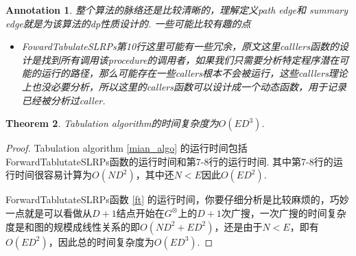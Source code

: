 \documentclass{article}
\newtheorem{theorem}{Theorem}[section]
\newtheorem{annotation}[theorem]{Annotation}
\begin{document}
\newpage

\begin{annotation}
\rm 整个算法的脉络还是比较清晰的，理解定义path edge和 summary edge就是为该算法的dp性质设计的. 一些可能比较有趣的点
\begin{itemize}
	\item FowardTabulateSLRPs第10行这里可能有一些冗余，原文这里calllers函数的设计是找到所有调用该procedure的调用者，如果我们只需要分析特定程序潜在可能的运行的路径，那么可能存在一些callers根本不会被运行，这些calllers理论上也没必要分析，所以这里的callers函数可以设计成一个动态函数，用于记录已经被分析过caller. 
\end{itemize}
\end{annotation}

\begin{theorem}
\rm Tabulation algorithm的时间复杂度为$O(ED^3)$.
\end{theorem}

\begin{proof}
\rm Tabulation algorithm \ref{mian_algo} 的运行时间包括ForwardTablutateSLRPs函数的运行时间和第7-8行的运行时间. 其中第7-8行的运行时间很容易计算为$O(ND^2)$，其中还$N < E$因此$O(ED^2)$. 

ForwardTablutateSLRPs函数 \ref{ft} 的运行时间，你要仔细分析是比较麻烦的，巧妙一点就是可以看做从$D+1$结点开始在$G^\otimes$上的$D+1$次广搜，一次广搜的时间复杂度是和图的规模成线性关系的即$O(ND^2+ED^2)$，还是由于$N < E$，即有$O(ED^2)$，因此总的时间复杂度为$O(ED^3)$. 
\end{proof}
\end{document}
